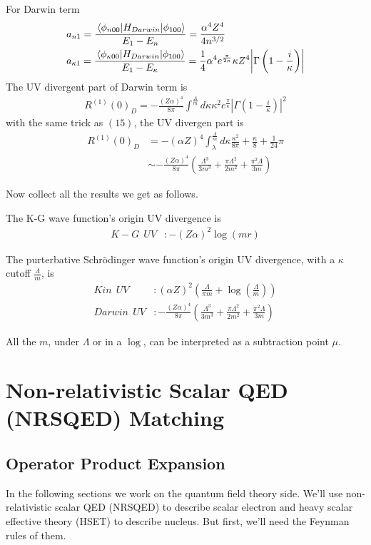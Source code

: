 \documentclass{article}
\newcommand{\ka}{\kappa}
\begin{document}
For Darwin term
\begin{align*}
	&a_{n1}=\frac{\mel{\phi_{n00}}{H_{Darwin}}{\phi_{100}}}{E_1-E_n}=\frac{\alpha ^4 Z^4}{4 n^{3/2}}\\
	&a_{\ka1}=\frac{\mel{\phi_{\ka00}}{H_{Darwin}}{\phi_{100}}}{E_1-E_{\ka}}=\frac{1}{4} \alpha ^4 e^{\frac{\pi }{2 \kappa }} \kappa  Z^4 \abs {\Gamma \left(1-\frac{i}{\kappa }\right)}
\end{align*}
The UV divergent part of Darwin term is
\begin{align}
	R^{(1)}(0)_D=-\frac{(Z\alpha)^4}{8\pi}\int^\frac{\Lambda}{m}d\ka\ka^2e^\frac{\pi}{\ka}|\Gamma(1-\frac{i}{\ka})|^2
\end{align}
with the same trick as $(15)$, the UV divergen part is
\begin{align}
	R^{(1)}(0)_{D} & =-(\alpha Z)^4\int_\lambda^\frac{\Lambda}{m}d\ka\frac{\ka^2}{8\pi}+\frac{\ka}{8}+\frac{1}{24}\pi         \\
	                  & \sim -\frac{(Z\alpha)^4}{8\pi}(\frac{\Lambda^3}{3m^3}+\frac{\pi\Lambda^2}{2m^2}+\frac{\pi^2\Lambda}{3m})
\end{align}

Now collect all the results we get as follows.

The K-G wave function's origin UV divergence is
\begin{align}
	K-G\ \ UV & :-(Z\alpha)^2\log(m r)
\end{align}

The purterbative Schr\"odinger wave function's origin UV divergence, with a $\ka$ cutoff $\frac{\Lambda}{m}$, is
\begin{align}
	Kin\ \  UV    & :(\alpha Z)^2(\frac{\Lambda}{\pi m}+\log(\frac{\Lambda}{m}))                                         \\
	Darwin\ \  UV & :-\frac{(Z\alpha)^4}{8\pi}(\frac{\Lambda^3}{3m^3}+\frac{\pi\Lambda^2}{2m^2}+\frac{\pi^2\Lambda}{3m})
\end{align}

All the $m$, under $\Lambda$ or in a $\log$, can be interpreted as a subtraction point $\mu$.

\section{Non-relativistic Scalar QED (NRSQED) Matching}
\subsection{Operator Product Expansion}
In the following sections we work on the quantum field theory side. We'll use non-relativistic scalar QED (NRSQED) to describe scalar electron and heavy scalar effective theory (HSET) to describe nucleus. But first, we'll need the Feynman rules of them. 
\end{document}
